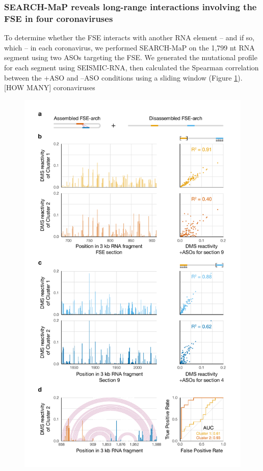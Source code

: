 \documentclass[main.tex]{subfiles}
\begin{document}
\subsubsection{SEARCH-MaP reveals long-range interactions involving the FSE in four coronaviruses}

To determine whether the FSE interacts with another RNA element -- and if so, which -- in each coronavirus, we performed SEARCH-MaP on the 1,799 nt RNA segment using two ASOs targeting the FSE.
We generated the mutational profile for each segment using SEISMIC-RNA, then calculated the Spearman correlation between the +ASO and --ASO conditions using a sliding window (Figure \ref{covs}).
[HOW MANY] coronaviruses 

\begin{figure}[ht]
	\includegraphics[height=0.95\textheight]{../MainFigures/fig3.pdf}
	\caption{}
	\label{covs}
\end{figure}
\end{document}
